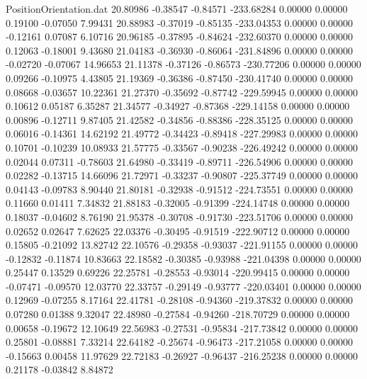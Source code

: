 \begin{filecontents}{PositionOrientation.dat}
  20.80986   -0.38547   -0.84571  -233.68284    0.00000    0.00000    0.19100   -0.07050    7.99431
  20.88983   -0.37019   -0.85135  -233.04353    0.00000    0.00000   -0.12161    0.07087    6.10716
  20.96185   -0.37895   -0.84624  -232.60370    0.00000    0.00000    0.12063   -0.18001    9.43680
  21.04183   -0.36930   -0.86064  -231.84896    0.00000    0.00000   -0.02720   -0.07067   14.96653
  21.11378   -0.37126   -0.86573  -230.77206    0.00000    0.00000    0.09266   -0.10975    4.43805
  21.19369   -0.36386   -0.87450  -230.41740    0.00000    0.00000    0.08668   -0.03657   10.22361
  21.27370   -0.35692   -0.87742  -229.59945    0.00000    0.00000    0.10612    0.05187    6.35287
  21.34577   -0.34927   -0.87368  -229.14158    0.00000    0.00000    0.00896   -0.12711    9.87405
  21.42582   -0.34856   -0.88386  -228.35125    0.00000    0.00000    0.06016   -0.14361   14.62192
  21.49772   -0.34423   -0.89418  -227.29983    0.00000    0.00000    0.10701   -0.10239   10.08933
  21.57775   -0.33567   -0.90238  -226.49242    0.00000    0.00000    0.02044    0.07311   -0.78603
  21.64980   -0.33419   -0.89711  -226.54906    0.00000    0.00000    0.02282   -0.13715   14.66096
  21.72971   -0.33237   -0.90807  -225.37749    0.00000    0.00000    0.04143   -0.09783    8.90440
  21.80181   -0.32938   -0.91512  -224.73551    0.00000    0.00000    0.11660    0.01411    7.34832
  21.88183   -0.32005   -0.91399  -224.14748    0.00000    0.00000    0.18037   -0.04602    8.76190
  21.95378   -0.30708   -0.91730  -223.51706    0.00000    0.00000    0.02652    0.02647    7.62625
  22.03376   -0.30495   -0.91519  -222.90712    0.00000    0.00000    0.15805   -0.21092   13.82742
  22.10576   -0.29358   -0.93037  -221.91155    0.00000    0.00000   -0.12832   -0.11874   10.83663
  22.18582   -0.30385   -0.93988  -221.04398    0.00000    0.00000    0.25447    0.13529    0.69226
  22.25781   -0.28553   -0.93014  -220.99415    0.00000    0.00000   -0.07471   -0.09570   12.03770
  22.33757   -0.29149   -0.93777  -220.03401    0.00000    0.00000    0.12969   -0.07255    8.17164
  22.41781   -0.28108   -0.94360  -219.37832    0.00000    0.00000    0.07280    0.01388    9.32047
  22.48980   -0.27584   -0.94260  -218.70729    0.00000    0.00000    0.00658   -0.19672   12.10649
  22.56983   -0.27531   -0.95834  -217.73842    0.00000    0.00000    0.25801   -0.08881    7.33214
  22.64182   -0.25674   -0.96473  -217.21058    0.00000    0.00000   -0.15663    0.00458   11.97629
  22.72183   -0.26927   -0.96437  -216.25238    0.00000    0.00000    0.21178   -0.03842    8.84872

\end{filecontents}
